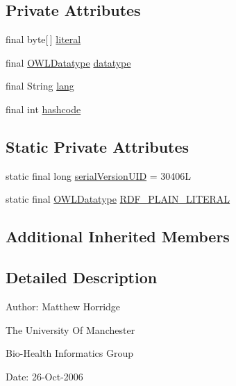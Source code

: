 \subsection*{Private Attributes}
\begin{DoxyCompactItemize}
\item 
final byte\mbox{[}$\,$\mbox{]} \hyperlink{classuk_1_1ac_1_1manchester_1_1cs_1_1owl_1_1owlapi_1_1_o_w_l_literal_impl_no_compression_a42ec8de09641c8de35ae44f159540fb9}{literal}
\item 
final \hyperlink{interfaceorg_1_1semanticweb_1_1owlapi_1_1model_1_1_o_w_l_datatype}{O\-W\-L\-Datatype} \hyperlink{classuk_1_1ac_1_1manchester_1_1cs_1_1owl_1_1owlapi_1_1_o_w_l_literal_impl_no_compression_a85b84035fcf40734ce472ab8ec7474ad}{datatype}
\item 
final String \hyperlink{classuk_1_1ac_1_1manchester_1_1cs_1_1owl_1_1owlapi_1_1_o_w_l_literal_impl_no_compression_a4ba98dcaaa940c6ac91a3986f03a9fad}{lang}
\item 
final int \hyperlink{classuk_1_1ac_1_1manchester_1_1cs_1_1owl_1_1owlapi_1_1_o_w_l_literal_impl_no_compression_a81a6b42db24aacf792d5057804870363}{hashcode}
\end{DoxyCompactItemize}
\subsection*{Static Private Attributes}
\begin{DoxyCompactItemize}
\item 
static final long \hyperlink{classuk_1_1ac_1_1manchester_1_1cs_1_1owl_1_1owlapi_1_1_o_w_l_literal_impl_no_compression_addc159e63559d2d4163ccd974b339be9}{serial\-Version\-U\-I\-D} = 30406\-L
\item 
static final \hyperlink{interfaceorg_1_1semanticweb_1_1owlapi_1_1model_1_1_o_w_l_datatype}{O\-W\-L\-Datatype} \hyperlink{classuk_1_1ac_1_1manchester_1_1cs_1_1owl_1_1owlapi_1_1_o_w_l_literal_impl_no_compression_a62a64938690e4ed89e2895484183f1ff}{R\-D\-F\-\_\-\-P\-L\-A\-I\-N\-\_\-\-L\-I\-T\-E\-R\-A\-L}
\end{DoxyCompactItemize}
\subsection*{Additional Inherited Members}


\subsection{Detailed Description}
Author\-: Matthew Horridge\par
 The University Of Manchester\par
 Bio-\/\-Health Informatics Group\par
 Date\-: 26-\/\-Oct-\/2006\par
 \par
 


